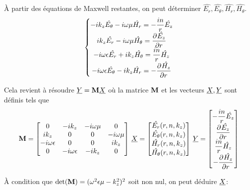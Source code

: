     À partir des équations de Maxwell restantes, on peut déterminer $\hat{E_r},\hat{E_\theta},\hat{H_r},\hat{H_\theta}$.
    \begin{equation}
        \left\lbrace
        \begin{matrix}
            -ik_z\hat{E_\theta} - i\w\mu \hat{H_r} = -\frac{in}{r}\hat{E_z}
            \\
            ik_z\hat{E_r} - i\w\mu \hat{H_\theta} = \ddr{r}{\hat{E_z}}
            \\
            -i\w\eps \hat{E_r} + ik_z \hat{H_\theta} = \frac{in}{r}\hat{H_z}
            \\
            -i\w\eps \hat{E_\theta} - ik_z \hat{H_r} = -\ddr{r}{\hat{H_z}}
        \end{matrix}
        \right.
    \end{equation}

    Cela revient à résoudre $\v{Y} = \mat{M}\v{X}$ où la matrice $\mat{M}$ et les vecteurs $\v{X}, \v{Y}$ sont définis tels que
    \begin{equation}
        \mat{M} =
        \begin{bmatrix}
        0 & -ik_z & -i\w\mu & 0 
        \\
        ik_z & 0 & 0 & -i\w\mu
        \\
        -i\w\eps & 0 & 0 & ik_z
        \\
        0 & -i\w\eps & -ik_z & 0
        \end{bmatrix}
        \,
        \v{X} = 
        \begin{bmatrix}
            \hat{E_r}(r,n,k_z)\\
            \hat{E_\theta}(r,n,k_z)\\
            \hat{H_r}(r,n,k_z)\\
            \hat{H_\theta}(r,n,k_z)
        \end{bmatrix}
        \,
        \v{Y} = 
        \begin{bmatrix}
            -\frac{in}{r}\hat{E_z}\\
            \ddr{r}{\hat{E_z}}\\
            \frac{in}{r}\hat{H_z}\\
            -\ddr{r}{\hat{H_z}}
        \end{bmatrix}
    \end{equation}

    À condition que $\det(\mat{M}) = (\w^2\eps\mu-k_z^2)^2$ soit non nul, on peut déduire $\v{X}$:

